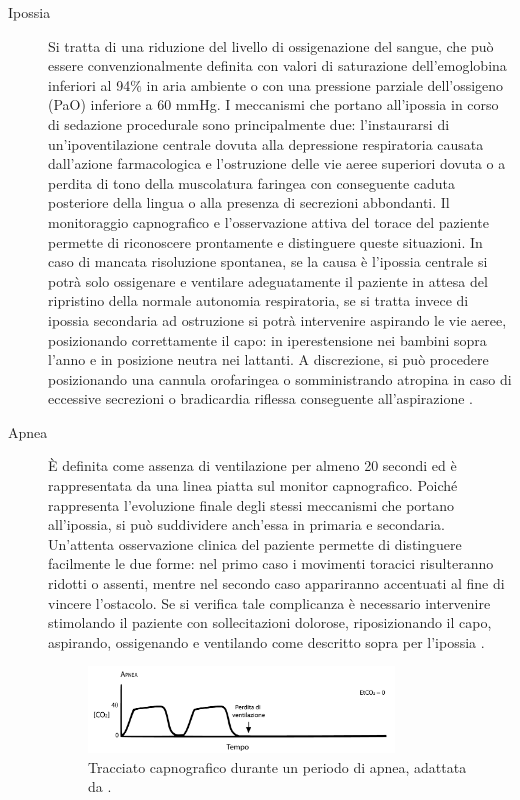 \begin{description}
\item[Ipossia] Si tratta di una riduzione del livello di ossigenazione del sangue, che può essere convenzionalmente definita con valori di saturazione dell'emoglobina inferiori al 94$\%$ in aria ambiente o con una pressione parziale dell'ossigeno (PaO) inferiore a 60 mmHg. I meccanismi che portano all'ipossia in corso di sedazione procedurale sono principalmente due: l'instaurarsi di un'ipoventilazione centrale dovuta alla depressione respiratoria causata dall'azione farmacologica e l'ostruzione delle vie aeree superiori dovuta o a perdita di tono della muscolatura faringea con conseguente caduta posteriore della lingua o alla presenza di secrezioni abbondanti. Il monitoraggio capnografico e l'osservazione attiva del torace del paziente permette di riconoscere prontamente e distinguere queste situazioni. In caso di mancata risoluzione spontanea, se la causa è l'ipossia centrale si potrà solo ossigenare e ventilare adeguatamente il paziente in attesa del ripristino della normale autonomia respiratoria, se si tratta invece di ipossia secondaria ad ostruzione si potrà intervenire aspirando le vie aeree, posizionando correttamente il capo: in iperestensione nei bambini sopra l'anno e in posizione neutra nei lattanti. A discrezione, si può procedere posizionando una cannula orofaringea o somministrando atropina in caso di eccessive secrezioni o bradicardia riflessa conseguente all'aspirazione \cite{Simeupsedazione}. 

\item[Apnea] \`E definita come assenza di ventilazione per almeno 20 secondi ed è rappresentata da una linea piatta sul monitor capnografico. Poiché rappresenta l'evoluzione finale degli stessi meccanismi che portano all'ipossia, si può suddividere anch'essa in primaria e secondaria. Un'attenta osservazione clinica del paziente permette di distinguere facilmente le due forme: nel primo caso i movimenti toracici risulteranno ridotti o assenti, mentre nel secondo caso appariranno accentuati al fine di vincere l'ostacolo. Se si verifica tale complicanza è necessario intervenire stimolando il paziente con sollecitazioni dolorose, riposizionando il capo, aspirando, ossigenando e ventilando come descritto sopra per l'ipossia \cite{Simeupsedazione}. 

\begin{figure}[h]
    \centering
    \includegraphics[width=0.8\textwidth]{Figure/apnea.pdf}
    \caption{Tracciato capnografico durante un periodo di apnea, adattata da \cite{Baruch2005}.}
    \label{fig:apnea}
\end{figure}


\end{description}
